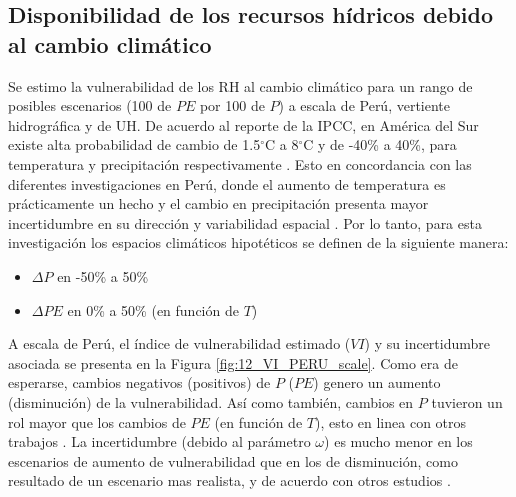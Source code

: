 \documentclass[12pt]{article}
\begin{document}



\subsection{Disponibilidad de los recursos hídricos debido al cambio climático}

Se estimo la vulnerabilidad de los RH al cambio climático para un rango de posibles escenarios (100 de $PE$ por 100 de $P$) a escala de Perú, vertiente hidrográfica y de UH. De acuerdo al reporte de la IPCC, en América del Sur existe alta probabilidad de cambio de 1.5$^{\circ}$C a 8$^{\circ}$C y de -40\% a 40\%, para temperatura y precipitación respectivamente
\citep{stocker2013climate}. Esto en concordancia con las diferentes investigaciones en Perú, donde el aumento de temperatura es prácticamente un hecho \citep{vuille2015impact,rosas2016towards,lopez2016recent,vicente2018recent,hunziker2018effects} y el cambio en precipitación presenta mayor incertidumbre en su dirección y variabilidad espacial \citep{zubieta2017spatial,de2017can,Aybar2019,Huerta2019a}. Por lo tanto, para esta investigación los espacios climáticos hipotéticos se definen de la siguiente manera:

\begin{itemize}

	\item $\Delta P$ en -50\% a 50\%
	\item $\Delta PE$ en 0\% a 50\% (en función de $T$)

\end{itemize}



A escala de Perú, el índice de vulnerabilidad estimado ($VI$) y su incertidumbre asociada se presenta en la Figura \ref{fig:12_VI_PERU_scale}. Como era de esperarse, cambios negativos (positivos) de $P$ ($PE$) genero un aumento (disminución) de la vulnerabilidad. Así como también, cambios en $P$ tuvieron un rol mayor que los cambios de $PE$ (en función de $T$), esto en linea con otros trabajos \citep{Singh2015,zhang2018bottom}. La incertidumbre (debido al parámetro $\omega$) es mucho menor en los escenarios de aumento de vulnerabilidad que en los de disminución, como resultado de un escenario mas realista, y de acuerdo con otros estudios \citep{singh2011trading,Singh2015,zhang2018bottom}.
\end{document}
